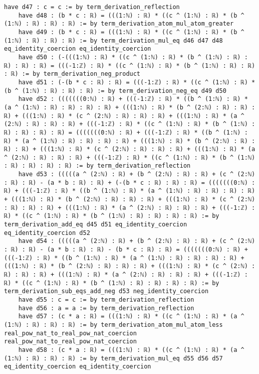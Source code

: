 \documentclass{article}
\begin{document}
\begin{tcolorbox}[colback=white!10, width=\linewidth]
\begin{lstlisting}[language=Lean4]
    have d47 : c = c := by term_derivation_reflection
    have d48 : (b * c : ℝ) = (((1:ℕ) : ℝ) * ((c ^ (1:ℕ) : ℝ) * (b ^ (1:ℕ) : ℝ) : ℝ) : ℝ) := by term_derivation_atom_mul_atom_greater
    have d49 : (b * c : ℝ) = (((1:ℕ) : ℝ) * ((c ^ (1:ℕ) : ℝ) * (b ^ (1:ℕ) : ℝ) : ℝ) : ℝ) := by term_derivation_mul_eq d46 d47 d48 eq_identity_coercion eq_identity_coercion
    have d50 : (-(((1:ℕ) : ℝ) * ((c ^ (1:ℕ) : ℝ) * (b ^ (1:ℕ) : ℝ) : ℝ) : ℝ) : ℝ) = (((-1:ℤ) : ℝ) * ((c ^ (1:ℕ) : ℝ) * (b ^ (1:ℕ) : ℝ) : ℝ) : ℝ) := by term_derivation_neg_product
    have d51 : (-(b * c : ℝ) : ℝ) = (((-1:ℤ) : ℝ) * ((c ^ (1:ℕ) : ℝ) * (b ^ (1:ℕ) : ℝ) : ℝ) : ℝ) := by term_derivation_neg_eq d49 d50
    have d52 : (((((((0:ℕ) : ℝ) + (((-1:ℤ) : ℝ) * ((b ^ (1:ℕ) : ℝ) * (a ^ (1:ℕ) : ℝ) : ℝ) : ℝ) : ℝ) + (((1:ℕ) : ℝ) * (b ^ (2:ℕ) : ℝ) : ℝ) : ℝ) + (((1:ℕ) : ℝ) * (c ^ (2:ℕ) : ℝ) : ℝ) : ℝ) + (((1:ℕ) : ℝ) * (a ^ (2:ℕ) : ℝ) : ℝ) : ℝ) + (((-1:ℤ) : ℝ) * ((c ^ (1:ℕ) : ℝ) * (b ^ (1:ℕ) : ℝ) : ℝ) : ℝ) : ℝ) = (((((((0:ℕ) : ℝ) + (((-1:ℤ) : ℝ) * ((b ^ (1:ℕ) : ℝ) * (a ^ (1:ℕ) : ℝ) : ℝ) : ℝ) : ℝ) + (((1:ℕ) : ℝ) * (b ^ (2:ℕ) : ℝ) : ℝ) : ℝ) + (((1:ℕ) : ℝ) * (c ^ (2:ℕ) : ℝ) : ℝ) : ℝ) + (((1:ℕ) : ℝ) * (a ^ (2:ℕ) : ℝ) : ℝ) : ℝ) + (((-1:ℤ) : ℝ) * ((c ^ (1:ℕ) : ℝ) * (b ^ (1:ℕ) : ℝ) : ℝ) : ℝ) : ℝ) := by term_derivation_reflection
    have d53 : (((((a ^ (2:ℕ) : ℝ) + (b ^ (2:ℕ) : ℝ) : ℝ) + (c ^ (2:ℕ) : ℝ) : ℝ) - (a * b : ℝ) : ℝ) + (-(b * c : ℝ) : ℝ) : ℝ) = (((((((0:ℕ) : ℝ) + (((-1:ℤ) : ℝ) * ((b ^ (1:ℕ) : ℝ) * (a ^ (1:ℕ) : ℝ) : ℝ) : ℝ) : ℝ) + (((1:ℕ) : ℝ) * (b ^ (2:ℕ) : ℝ) : ℝ) : ℝ) + (((1:ℕ) : ℝ) * (c ^ (2:ℕ) : ℝ) : ℝ) : ℝ) + (((1:ℕ) : ℝ) * (a ^ (2:ℕ) : ℝ) : ℝ) : ℝ) + (((-1:ℤ) : ℝ) * ((c ^ (1:ℕ) : ℝ) * (b ^ (1:ℕ) : ℝ) : ℝ) : ℝ) : ℝ) := by term_derivation_add_eq d45 d51 eq_identity_coercion eq_identity_coercion d52
    have d54 : (((((a ^ (2:ℕ) : ℝ) + (b ^ (2:ℕ) : ℝ) : ℝ) + (c ^ (2:ℕ) : ℝ) : ℝ) - (a * b : ℝ) : ℝ) - (b * c : ℝ) : ℝ) = (((((((0:ℕ) : ℝ) + (((-1:ℤ) : ℝ) * ((b ^ (1:ℕ) : ℝ) * (a ^ (1:ℕ) : ℝ) : ℝ) : ℝ) : ℝ) + (((1:ℕ) : ℝ) * (b ^ (2:ℕ) : ℝ) : ℝ) : ℝ) + (((1:ℕ) : ℝ) * (c ^ (2:ℕ) : ℝ) : ℝ) : ℝ) + (((1:ℕ) : ℝ) * (a ^ (2:ℕ) : ℝ) : ℝ) : ℝ) + (((-1:ℤ) : ℝ) * ((c ^ (1:ℕ) : ℝ) * (b ^ (1:ℕ) : ℝ) : ℝ) : ℝ) : ℝ) := by term_derivation_sub_eqs_add_neg d53 neg_identity_coercion
    have d55 : c = c := by term_derivation_reflection
    have d56 : a = a := by term_derivation_reflection
    have d57 : (c * a : ℝ) = (((1:ℕ) : ℝ) * ((c ^ (1:ℕ) : ℝ) * (a ^ (1:ℕ) : ℝ) : ℝ) : ℝ) := by term_derivation_atom_mul_atom_less real_pow_nat_to_real_pow_nat_coercion real_pow_nat_to_real_pow_nat_coercion
    have d58 : (c * a : ℝ) = (((1:ℕ) : ℝ) * ((c ^ (1:ℕ) : ℝ) * (a ^ (1:ℕ) : ℝ) : ℝ) : ℝ) := by term_derivation_mul_eq d55 d56 d57 eq_identity_coercion eq_identity_coercion

\end{lstlisting}
\end{tcolorbox}
\end{document}
